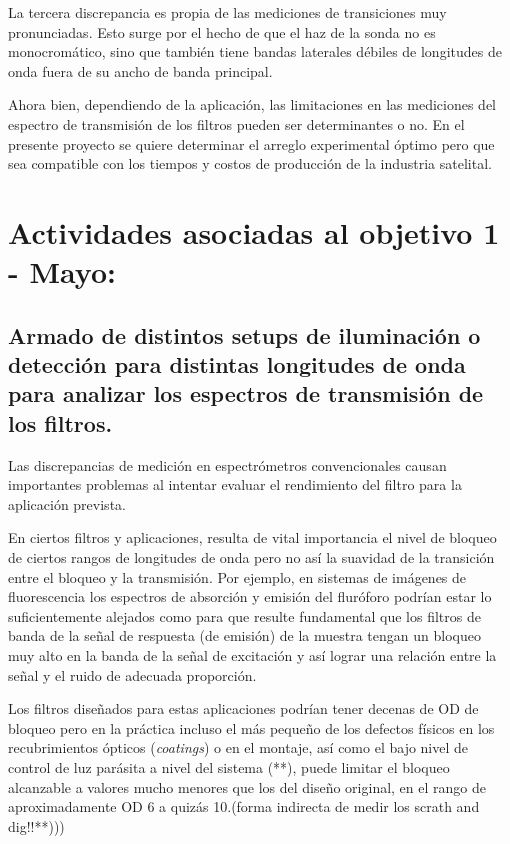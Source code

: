 \documentclass{ctuthesis}
\begin{document}
La tercera 
discrepancia es propia de las mediciones de transiciones muy 
pronunciadas. Esto surge 
por el hecho de que el 
haz de la sonda no es monocromático, sino que también tiene bandas 
laterales débiles de longitudes de onda fuera de su ancho de banda 
principal.




Ahora bien, dependiendo de la aplicación, las limitaciones en las mediciones 
del espectro de transmisión de los filtros pueden ser determinantes o no. En el 
presente proyecto se quiere determinar el arreglo experimental óptimo pero que 
sea compatible con los tiempos y costos de producción de la industria satelital.

\section*{Actividades asociadas al objetivo 1 - Mayo:}
\subsection*{ Armado de distintos setups de iluminación o detección para 
distintas longitudes de onda para analizar los espectros de transmisión de los 
filtros.}


\hspace{0.5cm}Las discrepancias de medición en espectrómetros convencionales 
causan 
importantes problemas al intentar evaluar el rendimiento del filtro para la 
aplicación prevista.


\hspace{0.5cm}En ciertos filtros y aplicaciones, resulta de vital importancia 
el 
nivel de bloqueo de ciertos rangos de longitudes de onda pero no así la 
suavidad de la transición entre el bloqueo y la transmisión. Por ejemplo, en 
sistemas de 
imágenes de fluorescencia los espectros de absorción y emisión del fluróforo 
podrían estar lo suficientemente alejados como para que resulte fundamental que 
los filtros de banda de la señal de respuesta (de emisión) de la muestra tengan 
un bloqueo muy alto en la banda de la señal de excitación y así lograr una 
relación entre la señal y el ruido de adecuada proporción. 

Los filtros 
diseñados para estas aplicaciones podrían tener decenas de OD de bloqueo pero 
en 
la práctica incluso el más pequeño de los defectos físicos en los 
recubrimientos ópticos (\textit{coatings}) o en el montaje, así como el bajo 
nivel de control de luz parásita a nivel del sistema (**), puede limitar el 
bloqueo alcanzable a valores mucho menores que los del diseño original, en el 
rango de aproximadamente OD 6 a quizás 10.(forma indirecta de medir los scrath 
and dig!!**))) 
\end{document}
